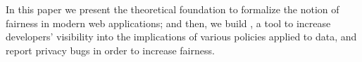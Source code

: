 In this paper we present the theoretical foundation to formalize the notion of
fairness in modern web applications; and then, we build \thetool, a tool to
increase developers’ visibility into the implications of various policies applied
to data, and report privacy bugs in order to increase fairness.


